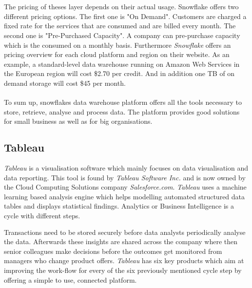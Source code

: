 \documentclass[../paper.tex]{subfiles}
\begin{document}
\\ \\
The pricing of theses layer depends on their actual usage. Snowflake offers two different pricing options. The first one is "On Demand". Customers are charged a fixed rate for the services that are consumed and are billed every month. The second one is "Pre-Purchased Capacity". A company can pre-purchase capacity which is the consumed on a monthly basis. Furthermore \textit{Snowflake} offers an pricing overview for each cloud platform and region on their website. As an example, a standard-level data warehouse running on Amazon Web Services in the European region will cost \$2.70 per credit. And in addition one TB of on demand storage will cost \$45 per month. \\ \\
To sum up, snowflakes data warehouse platform offers all the tools necessary to store, retrieve, analyse and process data. The platform provides good solutions for small business as well as for big organisations.

\subsection{Tableau}

\textit{Tableau} is a visualisation software which mainly focuses on data visualisation and data reporting. This tool is found by \textit{Tableau Software  Inc.} and is now owned by the Cloud Computing Solutions company \textit{Salesforce.com}. \textit{Tableau} uses a machine learning based analysis engine which helps modelling  automated structured data tables and displays statistical findings. Analytics or Business Intelligence is a cycle with different steps.

Transactions need to be stored securely before data analysts periodically analyse the data. Afterwards these insights are shared across the company where then senior colleagues make decisions before the outcomes get monitored from managers who change product offers. \textit{Tableau} has six key products which aim at improving the work-flow for every of the six previously mentioned cycle step by offering a simple to use, connected platform.
\end{document}
